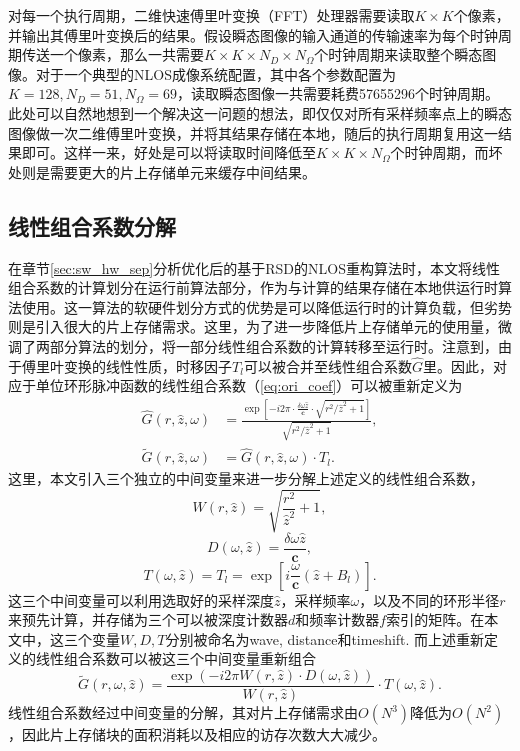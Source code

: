 \documentclass[master]{shtthesis}             %
\begin{document}
对每一个执行周期，二维快速傅里叶变换（FFT）处理器需要读取$K\times K$个像素，并输出其傅里叶变换后的结果。假设瞬态图像的输入通道的传输速率为每个时钟周期传送一个像素，那么一共需要$K\times K\times N_D\times N_\Omega$个时钟周期来读取整个瞬态图像。对于一个典型的NLOS成像系统配置\citep{Liu2020}，其中各个参数配置为$K=128, N_D=51, N_\Omega=69$，读取瞬态图像一共需要耗费57655296个时钟周期。此处可以自然地想到一个解决这一问题的想法，即仅仅对所有采样频率点上的瞬态图像做一次二维傅里叶变换，并将其结果存储在本地，随后的执行周期复用这一结果即可。这样一来，好处是可以将读取时间降低至$K\times K\times N_\Omega$个时钟周期，而坏处则是需要更大的片上存储单元来缓存中间结果。

\subsection{线性组合系数分解}\label{sec:coef_decomp}

在章节\ref{sec:sw_hw_sep}分析优化后的基于RSD的NLOS重构算法时，本文将线性组合系数的计算划分在运行前算法部分，作为与计算的结果存储在本地供运行时算法使用。这一算法的软硬件划分方式的优势是可以降低运行时的计算负载，但劣势则是引入很大的片上存储需求。这里，为了进一步降低片上存储单元的使用量，微调了两部分算法的划分，将一部分线性组合系数的计算转移至运行时。注意到，由于傅里叶变换的线性性质，时移因子$T_l$可以被合并至线性组合系数$\hat{G}$里。因此，对应于单位环形脉冲函数的线性组合系数（\ref{eq:ori_coef}）可以被重新定义为
\begin{align} \label{eq:coef}
    \hat{G}(r, \hat{z}, \omega) & = \frac{\exp{\left[-i2\pi\cdot\frac{\delta \omega\hat{z}}{\mathbf{c}}\cdot\sqrt{r^2/\hat{z}^2+1}\right]}}{\sqrt{r^2/\hat{z}^2+1}},\\
    \tilde{G}(r, \hat{z}, \omega) & = \hat{G}(r, \hat{z}, \omega) \cdot T_l .
\end{align}
这里，本文引入三个独立的中间变量来进一步分解上述定义的线性组合系数，
\begin{equation}
    W(r, \hat{z}) = \sqrt{\frac{r^2}{\hat{z}^2}+1},
\end{equation}
\begin{equation}
    D(\omega, \hat{z}) = \frac{\delta \omega \hat{z}}{\mathbf{c}},
\end{equation}
\begin{equation}
    T(\omega, \hat{z}) = T_l= \exp \left[ i\frac{\omega}{\mathbf{c}}(\hat{z}+B_l) \right].
\end{equation}
这三个中间变量可以利用选取好的采样深度$\hat{z}$，采样频率$\omega$，以及不同的环形半径$r$来预先计算，并存储为三个可以被深度计数器$d$和频率计数器$f$索引的矩阵。在本文中，这三个变量$W,D,T$分别被命名为wave, distance和timeshift. 而上述重新定义的线性组合系数可以被这三个中间变量重新组合
\begin{equation}
    \tilde{G}(r, \omega, \hat{z}) = \frac{\exp(-i2\pi W(r, \hat{z}) \cdot D(\omega, \hat{z}))}{W(r, \hat{z})} \cdot T(\omega, \hat{z}).
\end{equation}
线性组合系数经过中间变量的分解，其对片上存储需求由$O(N^3)$降低为$O(N^2)$，因此片上存储块的面积消耗以及相应的访存次数大大减少。
\end{document}
